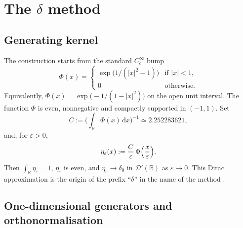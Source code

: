 \documentclass[final,3p,times]{elsarticle}
\theoremstyle{plain}
\theoremstyle{definition}
\theoremstyle{remark}
\newcommand{\dziti}{\ensuremath{\delta}\text{-Ziti}}
\newcommand{\dd}{\mathrm{d}}
\begin{document}
\section{The \dziti{} method}
\label{sec:method}

\subsection{Generating kernel}
\label{sec:kernel}

The construction starts from the standard $C^\infty_c$ bump
\begin{equation}
\label{eq:Phi}
\Phi(x)=
\begin{cases}
\exp\bigl(1/(\lvert x\rvert^2-1)\bigr) & \text{if }\lvert x\rvert<1,\\
0 & \text{otherwise.}
\end{cases}
\end{equation}
Equivalently, $\Phi(x)=\exp\bigl(-1/(1-\lvert x\rvert^2)\bigr)$ on the open
unit interval. The function $\Phi$ is even, nonnegative and compactly
supported in $(-1,1)$. Set
\begin{equation}
\label{eq:C}
C:=\Biggl(\int_{\mathbb{R}}\Phi(x)\,\dd x\Biggr)^{-1}
\simeq 2.252283621,
\end{equation}
and, for $\varepsilon>0$,
\begin{equation}
\label{eq:mollifier}
\eta_\varepsilon(x):=\frac{C}{\varepsilon}\,\Phi\Bigl(\frac{x}{\varepsilon}\Bigr).
\end{equation}
Then $\int_{\mathbb{R}}\eta_\varepsilon=1$, $\eta_\varepsilon$ is even, and
$\eta_\varepsilon\to\delta_0$ in $\mathcal{D}'(\mathbb{R})$ as
$\varepsilon\to 0$. This Dirac approximation is the origin of the prefix
``$\delta$'' in the name of the method \cite{Bsiss2016,Malek2021}.

\subsection{One-dimensional generators and orthonormalisation}
\label{sec:1d}
\end{document}
